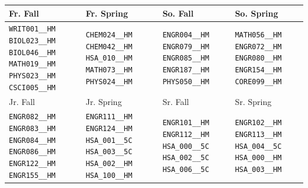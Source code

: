 \begin{tabular}{|p{}|p{}|p{}|p{}|}
    \hline
    Fr. Fall & Fr. Spring & So. Fall & So. Spring\\\hline
    \verb|WRIT001__HM| \verb|BIOL023__HM| \verb|BIOL046__HM| \verb|MATH019__HM| \verb|PHYS023__HM| \verb|CSCI005__HM|&
    \verb|CHEM024__HM| \verb|CHEM042__HM| \verb|HSA_010__HM| \verb|MATH073__HM| \verb|PHYS024__HM|&
    \verb|ENGR004__HM| \verb|ENGR079__HM| \verb|ENGR085__HM| \verb|ENGR187__HM| \verb|PHYS050__HM|&
    \verb|MATH056__HM| \verb|ENGR072__HM| \verb|ENGR080__HM| \verb|ENGR154__HM| \verb|CORE099__HM|\\
    \hline
    Jr. Fall & Jr. Spring & Sr. Fall & Sr. Spring\\\hline
    \verb|ENGR082__HM| \verb|ENGR083__HM| \verb|ENGR084__HM| \verb|ENGR086__HM| \verb|ENGR122__HM| \verb|ENGR155__HM|&
    \verb|ENGR111__HM| \verb|ENGR124__HM| \verb|HSA_001__5C| \verb|HSA_003__5C| \verb|HSA_002__HM| \verb|HSA_100__HM|&
    \verb|ENGR101__HM| \verb|ENGR112__HM| \verb|HSA_000__5C| \verb|HSA_002__5C| \verb|HSA_006__5C|&
    \verb|ENGR102__HM| \verb|ENGR113__HM| \verb|HSA_004__5C| \verb|HSA_000__HM| \verb|HSA_003__HM|\\
    \hline
\end{tabular}